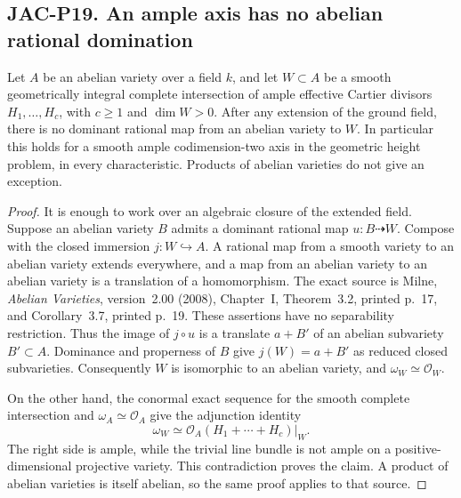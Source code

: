
\subsection*{JAC-P19. An ample axis has no abelian rational domination}

\begin{proposition}[JAC-P19]
Let $A$ be an abelian variety over a field $k$, and let
$W\subset A$ be a smooth geometrically integral complete
intersection of ample effective Cartier divisors
$H_1,\ldots,H_c$, with $c\ge1$ and $\dim W>0$.
After any extension of the ground field, there is no
dominant rational map from an abelian variety to $W$.
In particular this holds for a smooth ample
codimension-two axis in the geometric height problem,
in every characteristic. Products of abelian varieties
do not give an exception.
\end{proposition}

\begin{proof}
It is enough to work over an algebraic closure of the
extended field. Suppose an abelian variety $B$ admits
a dominant rational map $u:B\dashrightarrow W$.
Compose with the closed immersion $j:W\hookrightarrow A$.
A rational map from a smooth variety to an abelian
variety extends everywhere, and a map from an abelian
variety to an abelian variety is a translation of a
homomorphism. The exact source is Milne,
\emph{Abelian Varieties}, version~2.00 (2008), Chapter~I,
Theorem~3.2, printed p.~17, and Corollary~3.7,
printed p.~19. These assertions have no separability
restriction. Thus the image of $j\circ u$ is a
translate $a+B'$ of an abelian subvariety $B'\subset A$.
Dominance and properness of $B$ give
$j(W)=a+B'$ as reduced closed subvarieties. Consequently
$W$ is isomorphic to an abelian variety, and
$\omega_W\simeq\mathcal O_W$.

On the other hand, the conormal exact sequence for the
smooth complete intersection and $\omega_A\simeq\mathcal O_A$
give the adjunction identity
\[
       \omega_W\simeq
       \mathcal O_A(H_1+\cdots+H_c)|_W.
\]
The right side is ample, while the trivial line bundle
is not ample on a positive-dimensional projective
variety. This contradiction proves the claim.
A product of abelian varieties is itself abelian,
so the same proof applies to that source.
\end{proof}

